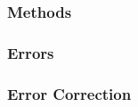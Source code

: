 \subsubsection{Methods}\label{ra:ssec:meth}
%
\subsubsection{Errors}\label{ra:ssec:err}
%
\subsubsection{Error Correction}\label{ra:ssec:ec}
